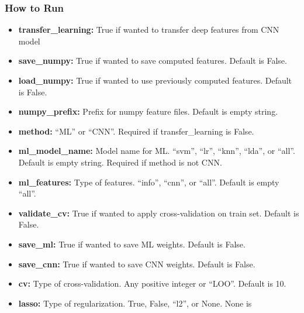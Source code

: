 
\subsubsection*{How to Run}\label{how-to-run}

\begin{itemize}
	\itemsep1pt\parskip0pt
	\item
	\textbf{transfer\_learning:} True if wanted to transfer deep features from CNN
	model\\
	\item
	\textbf{save\_numpy:} True if wanted to save computed features. Default is
	False.\\
	\item
	\textbf{load\_numpy:} True if wanted to use previously computed features.
	Default is False.\\
	\item
	\textbf{numpy\_prefix:} Prefix for numpy feature files. Default is empty
	string.\\
	\item
	\textbf{method:} ``ML'' or ``CNN''. Required if transfer\_learning is False.\\
	\item
	\textbf{ml\_model\_name:} Model name for ML. ``svm'', ``lr'', ``knn'', ``lda'',
	or ``all''. Default is empty string. Required if method is not CNN.\\
	\item
	\textbf{ml\_features:} Type of features. ``info'', ``cnn'', or ``all''. Default
	is empty ``all''.\\
	\item
	\textbf{validate\_cv:} True if wanted to apply cross-validation on train set.
	Default is False.\\
	\item
	\textbf{save\_ml:} True if wanted to save ML weights. Default is False.\\
	\item
	\textbf{save\_cnn:} True if wanted to save CNN weights. Default is False.\\
	\item
	\textbf{cv:} Type of cross-validation. Any positive integer or ``LOO''. Default
	is 10.\\
	\item
	\textbf{lasso:} Type of regularization. True, False, ``l2'', or None. None is

\end{itemize}
